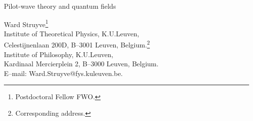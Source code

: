 \documentclass[12pt]{article}
\begin{document}
\vspace*{1.0cm}
\noindent
{\bf
{\large
\begin{center}
Pilot-wave theory and quantum fields
\end{center}
}
}

\vspace*{.5cm}
\begin{center}
Ward Struyve{\footnote{Postdoctoral Fellow FWO.}}\\
Institute of Theoretical Physics, K.U.Leuven,\\
Celestijnenlaan 200D, B--3001 Leuven, Belgium.{\footnote{Corresponding address.}}\\
Institute of Philosophy, K.U.Leuven,\\
Kardinaal Mercierplein 2, B--3000 Leuven, Belgium.\\
E--mail: Ward.Struyve@fys.kuleuven.be.
\end{center}

\begin{abstract}
\noindent
Pilot-wave theories provide possible solutions to the measurement problem. In such theories, quantum systems are not only described by the state vector, but also by some additional variables. These additional variables, also called beables, can be particle positions, field configurations, strings, etc. In this paper we focus our attention on pilot-wave theories in which the additional variables are field configurations. The first such theory was proposed by Bohm for the free electromagnetic field. Since Bohm, similar pilot-wave theories have been proposed for other quantum fields. The purpose of this paper is to present an overview and further development of these proposals. We discuss various bosonic quantum field theories such as the Schr{\"o}\-ding\-er field, the free electromagnetic field, scalar quantum electrodynamics and the Abelian Higgs model. In particular, we compare the pilot-wave theories proposed by Bohm and by Valentini for the electromagnetic field, finding that they are equivalent. We further discuss the proposals for fermionic fields by Holland and Valentini. In the case of Holland's model we indicate that further work is required in order to show that the model is capable of reproducing the standard quantum predictions. We also consider a similar model, which does not seem to reproduce the standard quantum predictions. In the case of Valentini's model we point out a problem that seems hard to overcome.
\end{abstract}


\renewcommand{\baselinestretch}{1.1}

\end{document}
